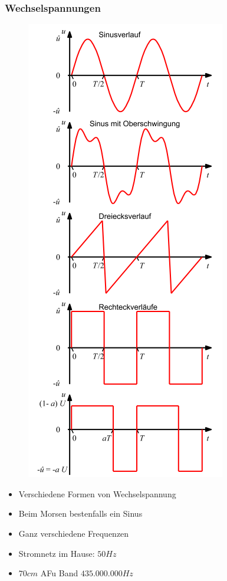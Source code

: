 \begin{frame}
  \frametitle{Wechselspannungen}
    \begin{minipage}{0.4\textwidth}
      \begin{figure}
	\includegraphics[width=.5\textwidth]{e02/Wechselspannungsformen.png}
     \end{figure}
    \end{minipage}
    \begin{minipage}{0.4\textwidth}	
      \begin{itemize}
        \item Verschiedene Formen von Wechselspannung
        \item Beim Morsen bestenfalls ein Sinus
        \item Ganz verschiedene Frequenzen
        \item Stromnetz im Hause: $50Hz$ 
        \item $70cm$ AFu Band $435.000.000Hz$
      \end{itemize}
    \end{minipage}
\end{frame}

